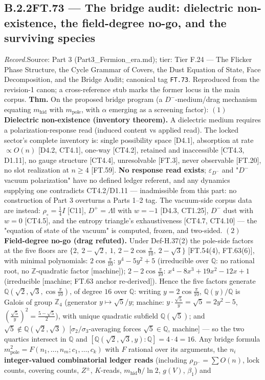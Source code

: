 \documentclass[11pt,openany]{report}
\theoremstyle{canonplain}
\theoremstyle{canondef}
\begin{document}
\subsection*{\texorpdfstring{B.2.2\quad FT.73 — The bridge audit: dielectric non-existence, the field-degree no-go, and the surviving species}{FT.73 B.2.2}}
\label{tag:FT-73}
{\small \textit{Record.}\quad Source: Part 3 (Part3\_Fermion\_era.md); tier: Tier F.24 — The Flicker Phase Structure, the Cycle Grammar of Covers, the Dust Equation of State, Face Decomposition, and the Bridge Audit; canonical tag \texttt{FT.73}. Reproduced from the revision-1 canon; a cross-reference stub marks the former locus in the main corpus.}
\medskip
\textbf{Thm.} On the proposed bridge program (a $D^-$-medium/drag mechanism equating $m_{\mathrm{hid}}$ with $m_{\mathrm{pole}}$, with $\alpha$ emerging as a screening factor): $(1)$ \textbf{Dielectric non-existence (inventory theorem).} A dielectric medium requires a polarization-response read (induced content vs applied read). The locked sector's complete inventory is: single possibility space [D4.1], absorption at rate $\propto O(n)$ [D4.2, CT4.1], one-way [CT4.2], retained and inaccessible [CT4.3, D1.11], no gauge structure [CT4.4], unresolvable [FT.3], never observable [FT.20], no slot realization at $n\ge4$ [FT.59]. \textbf{No response read exists}; $\varepsilon_{D^-}$ and "$D^-$ vacuum polarization" have no defined ledger referent, and any dynamics supplying one contradicts CT4.2/D1.11 — inadmissible from this part: no construction of Part 3 overturns a Parts 1–2 tag. The vacuum-side corpus data are instead: $\rho_\circ=\tfrac14 I$ [C11], $D^+=\Lambda\mathbb I$ with $w=-1$ [D4.3, CT1.25], $D^-$ dust with $w=0$ [CT4.5], and the entropy triangle's exhaustiveness [CT4.7, CT4.10] — the "equation of state of the vacuum" is computed, frozen, and two-sided. $(2)$ \textbf{Field-degree no-go (drag refuted).} Under Def-H.37(2) the pole-side factors at the five floors are $\{2,\ 2-\sqrt2,\ 1,\ 2-2\cos\tfrac\pi{10},\ 2-\sqrt3\}$ [FT.54(4), FT.63(6)], with minimal polynomials: $2\cos\tfrac\pi{10}$: $y^4-5y^2+5$ (irreducible over $\mathbb Q$: no rational root, no $\mathbb Z$-quadratic factor [machine]); $2-2\cos\tfrac\pi{10}$: $x^4-8x^3+19x^2-12x+1$ (irreducible [machine; FT.63 anchor re-derived]). Hence the five factors generate $\mathbb Q(\sqrt2,\sqrt3,\cos\tfrac\pi{10})$, of degree $16$ over $\mathbb Q$: writing $y=2\cos\tfrac\pi{10}$, $\mathbb Q(y)/\mathbb Q$ is Galois of group $\mathbb Z_4$ (generator $y\mapsto\sqrt5/y$; machine: $y\cdot\tfrac{\sqrt5}y=\sqrt5=2y^2-5$, $(\tfrac{\sqrt5}y)^2=\tfrac{5-\sqrt5}2$), with unique quadratic subfield $\mathbb Q(\sqrt5)$; and $\sqrt5\notin\mathbb Q(\sqrt2,\sqrt3)$ [$\sigma_2/\sigma_3$-averaging forces $\sqrt5\in\mathbb Q$, machine] — so the two quartics intersect in $\mathbb Q$ and $[\mathbb Q(\sqrt2,\sqrt3,y):\mathbb Q]=4\cdot4=16$. Any bridge formula $m^2_{\mathrm{pole}}=F(n_1,\dots,n_m;c_1,\dots,c_k)$ with $F$ rational over its arguments, the $n_i$ \textbf{integer-valued combinatorial ledger reads} (including $\rho_{D^-}=\sum O(n)$, lock counts, covering counts, $Z^\pm$, $K$-reads, $m_{\mathrm{hid}}\mathfrak h/\ln2$, $g(V)$, $\beta_1$) and 
\end{document}
